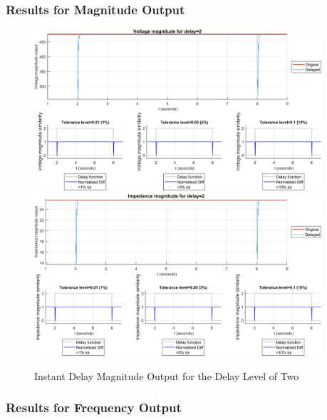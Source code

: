 \subsubsection{Results for Magnitude Output}
\begin{figure}
    \caption{Instant Delay Magnitude Output for the Delay Level of Two}
    \includegraphics[width=0.95\textwidth]{PMUsim-figures/DelayOf_2/Instant_vMagnitude.png}    
      \includegraphics[width=0.95\textwidth]{PMUsim-figures/DelayOf_2/Instant_iMagnitude.png}
    \label{fig:PMUsim_Two_Magnitude}
    \begin{small}
     \end{small}
\end{figure}
\newpage \subsubsection{Results for Frequency Output}
